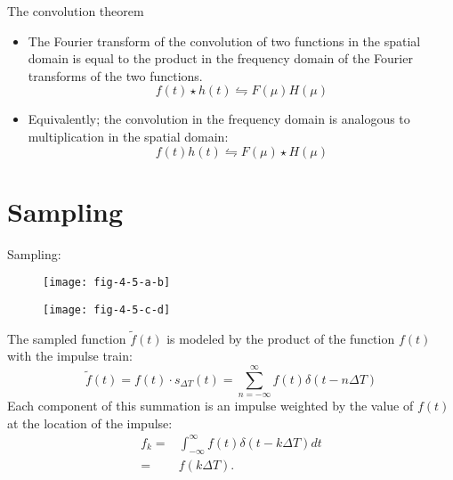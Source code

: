 
\begin{frame}
\begin{block}{The convolution theorem}
\begin{itemize}
\item The Fourier transform of the convolution of two functions in the spatial domain is equal to the product in the frequency domain of the Fourier transforms of the two functions.
\begin{equation}
\boxed{
f(t) \star h(t) \leftrightharpoons F(\mu) H(\mu)
}
\end{equation}
\item Equivalently; the convolution in the frequency domain is analogous to multiplication in the spatial domain:
\begin{equation}
\boxed{
f(t)h(t) \leftrightharpoons F(\mu) \star H(\mu)
}
\end{equation}
\end{itemize}
\end{block}
\end{frame}


\section{Sampling}


\begin{frame}
Sampling:
\begin{figure}
\centering
\texttt{[image: fig-4-5-a-b]}
\end{figure}
\begin{figure}
\centering
\texttt{[image: fig-4-5-c-d]}
\end{figure}
\end{frame}


\begin{frame}
The sampled function $\tilde{f}(t)$ is modeled by the product of the function $f(t)$ with the impulse train:
\begin{equation}
\tilde{f}(t) = f(t)\cdot s_{\Delta T} (t) =  \sum_{n=-\infty}^{\infty} f(t) \delta(t - n\Delta T)
\end{equation}
Each component of this summation is an impulse weighted by the value of $f(t)$ at the location of the impulse:
\begin{equation}
\begin{split}
f_{k} = & \int_{-\infty}^{\infty} f(t) \delta(t-k\Delta T) dt \\
= & f(k\Delta T).
\end{split}
\end{equation}
\end{frame}

